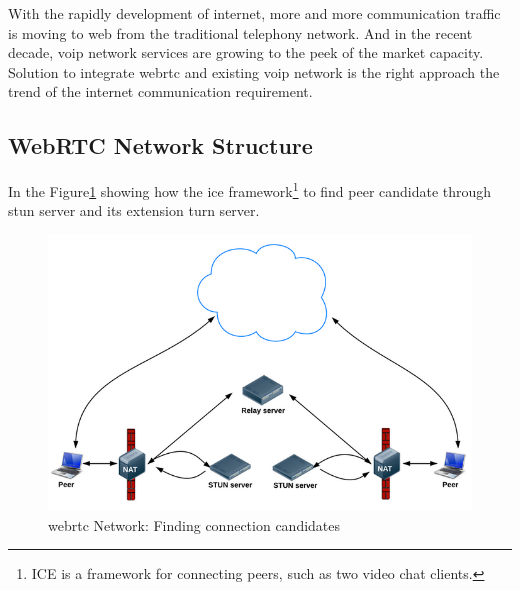 \par With the rapidly development of internet, more and more communication traffic is moving to web from the traditional telephony network. And in the recent decade, \gls{voip} network services are growing to the peek of the market capacity. Solution to integrate \gls{webrtc} and existing \gls{voip} network is the right approach the trend of the internet communication requirement.

\subsection{WebRTC Network Structure}

\noindent In the Figure\ref{fig:webrtc_network_finCandidate}\cite{html5rock:webrtc} showing how the \gls{ice} framework\footnote{ICE is a framework for connecting peers, such as two video chat clients.\cite{wiki:ice}} to find peer candidate through \gls{stun} server and its extension \gls{turn} server.

\begin{figure}
	\centering
    	\includegraphics[height=0.30\textheight,natwidth=610,natheight=642]{figs/webrtc_network_finCandidate.png}
  	\caption{\gls{webrtc} Network: Finding connection candidates}
  	\label{fig:webrtc_network_finCandidate}
\end{figure} 

